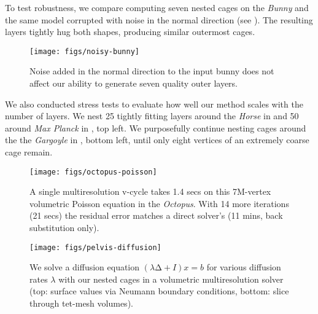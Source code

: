 To test robustness, we compare computing seven nested cages on the \emph{Bunny}
and the same model corrupted with noise in the normal direction (see
). The resulting layers tightly hug both shapes, producing
similar outermost cages.

\begin{figure}
  \texttt{[image: figs/noisy-bunny]}
  \caption{Noise added in the normal direction to the input bunny does not
  affect our ability to generate seven quality outer layers.}
  \label{fig:noisy-bunny}
\end{figure}

We also conducted stress tests to evaluate how well our method scales with the
number of layers. We nest 25 tightly fitting layers around the \emph{Horse} in
 and 50 around \emph{Max Planck} in , top
left.
%
We purposefully continue nesting cages around the the \emph{Gargoyle} in
, bottom left, until only eight vertices of an extremely coarse
cage remain.

\begin{figure}
  \texttt{[image: figs/octopus-poisson]}
  \caption{A single multiresolution v-cycle takes 1.4 secs on this 7M-vertex
  volumetric Poisson equation in the \emph{Octopus}. With 14 more iterations
  (21 secs) the residual error matches a direct solver's (11 mins, back
  substitution only).}
  \label{fig:octopus-poisson}
\end{figure}
\begin{figure}
  \texttt{[image: figs/pelvis-diffusion]}
  \caption{We solve a diffusion equation $(λ∆+I) x = b$ for various diffusion
  rates $λ$ with our nested cages in a volumetric multiresolution solver (top:
  surface values via Neumann boundary conditions, bottom: slice through
  tet-mesh volumes).}
  \label{fig:pelvis-diffusion}
\end{figure}

